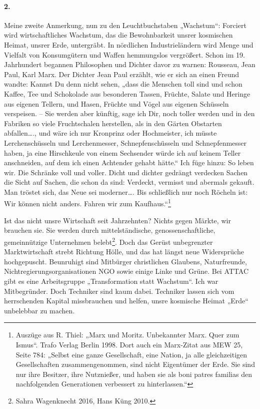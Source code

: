 \documentclass[12pt,a4paper]{article}
\begin{document}
\paragraph{2.}
Meine zweite Anmerkung, nun zu den Leuchtbuchstaben „Wachstum“: Forciert wird
wirtschaftliches Wachstum, das die Bewohnbarkeit unsrer kosmischen Heimat,
unsrer Erde, untergräbt. In nördlichen Industrieländern wird Menge und Vielfalt
von Konsumgütern und Waffen hemmungslos vergrößert. Schon im 19. Jahrhundert
begannen Philosophen und Dichter davor zu warnen: Rousseau, Jean Paul, Karl
Marx. Der Dichter Jean Paul erzählt, wie er sich an einen Freund wandte: Kannst
Du denn nicht sehen, „dass die Menschen toll sind und schon Kaffee, Tee und
Schokolade aus besonderen Tassen, Früchte, Salate und Heringe aus eigenen
Tellern, und Hasen, Früchte und Vögel aus eigenen Schüsseln verspeisen. – Sie
werden aber künftig, sage ich Dir, noch toller werden und in den Fabriken so
viele Fruchtschalen herstellen, als in den Gärten Obstarten abfallen…., und
wäre ich nur Kronprinz oder Hochmeister, ich müsste Lerchenschüsseln und
Lerchenmesser, Schnepfenschüsseln und Schnepfenmesser haben, ja eine
Hirschkeule von einem Sechsender würde ich auf keinem Teller anschneiden, auf
dem ich einen Achtender gehabt hätte.“ Ich füge hinzu: So leben wir. Die
Schränke voll und voller. Dicht und dichter gedrängt verdecken Sachen die Sicht
auf Sachen, die schon da sind: Verdeckt, vermisst und abermals gekauft. Man
tröstet sich, das Neue sei moderner…. Bis schließlich nur noch Röcheln ist: Wir
können nicht anders. Fahren wir zum Kaufhaus.“\footnote{Auszüge aus R. Thiel:
  „Marx und Moritz. Unbekannter Marx. Quer zum Ismus“. Trafo Verlag Berlin
  1998.  Dort auch ein Marx-Zitat aus MEW 25, Seite 784: „Selbst eine ganze
  Gesellschaft, eine Nation, ja alle gleichzeitigen Gesellschaften
  zusammengenommen, sind nicht Eigentümer der Erde. Sie sind nur ihre Besitzer,
  ihre Nutznießer, und haben sie als boni patres familias den nachfolgenden
  Generationen verbessert zu hinterlassen.“}

Ist das nicht unsre Wirtschaft seit Jahrzehnten? Nichts gegen Märkte, wir
brauchen sie. Sie werden durch mittelständische, genossenschaftliche,
gemeinnützige Unternehmen belebt\footnote{Sahra Wagenknecht 2016, Hans Küng
  2010.}.  Doch das Gerüst unbegrenzter Marktwirtschaft strebt Richtung Hölle,
und das hat längst neue Widersprüche hochgepuscht. Beunruhigt sind Mitbürger
christlichen Glaubens, Naturfreunde, Nichtregierungsorganisationen NGO sowie
einige Linke und Grüne. Bei ATTAC gibt es eine Arbeitsgruppe „Transformation
statt Wachstum“. Ich war Mitbegründer. Doch Techniker sind kaum dabei.
Techniker lassen sich vom herrschenden Kapital missbrauchen und helfen, unsre
kosmische Heimat „Erde“ unbelebbar zu machen.
\end{document}
